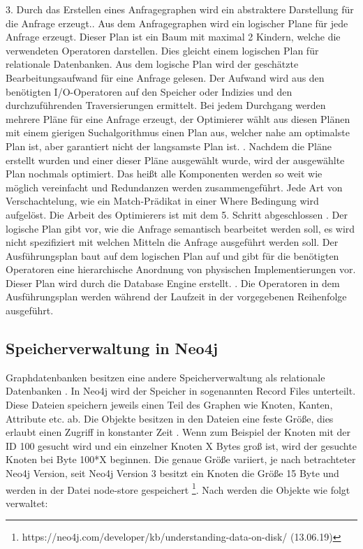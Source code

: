 3. Durch das Erstellen eines Anfragegraphen wird ein abstraktere Darstellung für die Anfrage erzeugt.\newline {}. Aus dem Anfragegraphen wird ein logischer Plane für jede Anfrage erzeugt. Dieser Plan ist ein Baum mit maximal 2 Kindern, welche die verwendeten Operatoren darstellen. Dies gleicht einem logischen Plan für relationale Datenbanken. Aus dem logische Plan wird der geschätzte Bearbeitungsaufwand für eine Anfrage gelesen. Der Aufwand wird aus den benötigten I/O-Operatoren auf den Speicher oder Indizies und den durchzuführenden Traversierungen ermittelt. Bei jedem Durchgang werden mehrere Pläne für eine Anfrage erzeugt, der Optimierer wählt aus diesen Plänen mit einem gierigen Suchalgorithmus einen Plan aus, welcher nahe am optimalste Plan ist, aber garantiert nicht der langsamste Plan ist. \newline {}. Nachdem die Pläne erstellt wurden und einer dieser Pläne ausgewählt wurde, wird der ausgewählte Plan nochmals optimiert. Das heißt alle Komponenten werden so weit wie möglich vereinfacht und Redundanzen werden zusammengeführt. Jede Art von Verschachtelung, wie ein Match-Prädikat in einer Where Bedingung wird aufgelöst. Die Arbeit des Optimierers ist mit dem 5. Schritt abgeschlossen \newline {}. Der logische Plan gibt vor, wie die Anfrage semantisch bearbeitet werden soll, es wird nicht spezifiziert mit welchen Mitteln die Anfrage ausgeführt werden soll. Der Ausführungsplan baut auf dem logischen Plan auf und gibt für die benötigten Operatoren eine hierarchische Anordnung von physischen  Implementierungen vor. Dieser Plan wird durch die Database Engine erstellt.  \newline {}. Die Operatoren in dem Ausführungsplan werden während der Laufzeit in der vorgegebenen Reihenfolge ausgeführt. 


\subsection{Speicherverwaltung in Neo4j}
Graphdatenbanken besitzen eine andere Speicherverwaltung als relationale Datenbanken \parencite{angles2012comparison}. In Neo4j wird der Speicher in sogenannten Record Files unterteilt. Diese Dateien speichern jeweils einen Teil des Graphen wie Knoten, Kanten, Attribute etc. ab. Die Objekte besitzen in den Dateien eine feste Größe, dies erlaubt einen Zugriff in konstanter Zeit \parencite{robinson2013graph}. Wenn zum Beispiel der Knoten mit der ID 100 gesucht wird und ein einzelner Knoten X Bytes groß ist, wird der gesuchte Knoten bei Byte 100*X beginnen. Die genaue Größe  variiert, je nach betrachteter Neo4j Version, seit Neo4j Version 3 besitzt ein Knoten die Größe 15 Byte und werden in der Datei node-store gespeichert \footnote{https://neo4j.com/developer/kb/understanding-data-on-disk/ (13.06.19)}. Nach \parencite{robinson2013graph} werden die Objekte wie folgt verwaltet:
